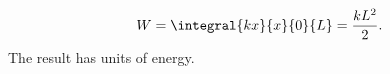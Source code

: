 \begin{equation}
  W=\integral{kx}{x}{0}{L}=\frac{kL^2}{2}.
  \label{eq:work}
\end{equation}
The result has units of energy.
